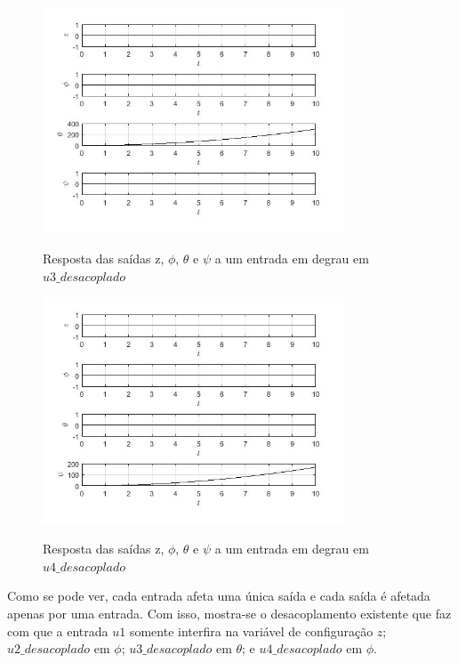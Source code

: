 \begin{figure}[!htb]
    \centering
    \caption{Resposta das saídas z, $\phi$, $\theta$ e $\psi$ a um entrada em degrau em $u3\_desacoplado$}
    \includegraphics[width=0.8\textwidth]{./04-figuras/figuras_pos_banca/1-mostrando_desacoplamento/graphs_step_u3}
    \label{fig:graphs_step_u3}
\end{figure}

\begin{figure}[!htb]
    \centering
    \caption{Resposta das saídas z, $\phi$, $\theta$ e $\psi$ a um entrada em degrau em $u4\_desacoplado$}
    \includegraphics[width=0.8\textwidth]{./04-figuras/figuras_pos_banca/1-mostrando_desacoplamento/graphs_step_u4}
    \label{fig:graphs_step_u4}
\end{figure}

Como se pode ver, cada entrada afeta uma única saída e cada saída é afetada apenas por uma entrada. Com isso, mostra-se o desacoplamento existente que faz com que a entrada $u1$ somente interfira na variável de configuração $z$; $u2\_desacoplado$ em $\phi$; $u3\_desacoplado$ em $\theta$; e $u4\_desacoplado$ em $\phi$.
